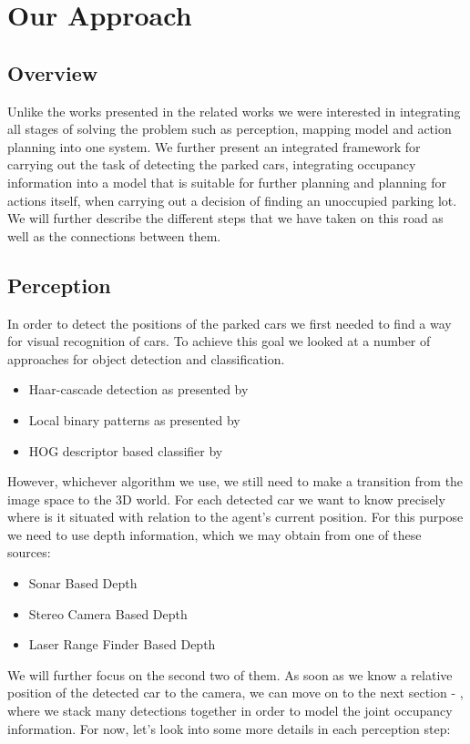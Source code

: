 \chapter{Our Approach}
\label{cha:our_approach}

\section{Overview} %
\label{sec:overview}
Unlike the works presented in the related works we were interested in integrating all stages of solving the problem such as perception, mapping model and action planning into one system. We further present an integrated framework for carrying out the task of detecting the parked cars, integrating occupancy information into a model that is suitable for further planning and planning for actions itself, when carrying out a decision of finding an unoccupied parking lot.
We will further describe the different steps that we have taken on this road as well as the connections between them.

\section{Perception} %
\label{sec:perception}
    In order to detect the positions of the parked cars we first needed to find a way for visual recognition of cars. To achieve this goal we looked at a number of approaches for object detection and classification.
    \begin{itemize}
        \item Haar-cascade detection as presented by \cite{violajones2001}
        \item Local binary patterns as presented by 
        \item HOG descriptor based classifier by \cite{dalal2005}
    \end{itemize}
    However, whichever algorithm we use, we still need to make a transition from the image space to the 3D world. For each detected car we want to know precisely where is it situated with relation to the agent's current position.
    For this purpose we need to use depth information, which we may obtain from one of these sources:
    \begin{itemize}
        \item Sonar Based Depth
        \item Stereo Camera Based Depth
        \item Laser Range Finder Based Depth
    \end{itemize}
    We will further focus on the second two of them.
    As soon as we know a relative position of the detected car to the camera, we can move on to the next section - , where we stack many detections together in order to model the joint occupancy information.
    For now, let's look into some more details in each perception step:
